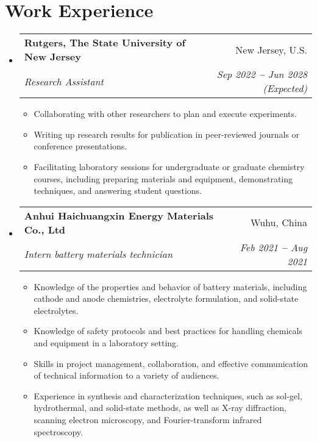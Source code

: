 \documentclass[letterpaper,11pt]{article}
\makeatletter
\newcommand{\resumeItem}[1]{
	\item\small{
		{#1 \vspace{-2pt}}
	}
}
\newcommand{\resumeSubheading}[4]{
	\vspace{-2pt}\item
	\begin{tabular*}{0.97\textwidth}[t]{l@{\extracolsep{\fill}}r}
		\textbf{#1} & #2 \\
		\textit{\small#3} & \textit{\small #4} \\
	\end{tabular*}\vspace{-7pt}
}
\newcommand{\resumeSubHeadingListStart}{\begin{itemize}[leftmargin=0.15in, label={}]}
\newcommand{\resumeSubHeadingListEnd}{\end{itemize}}
\newcommand{\resumeItemListStart}{\begin{itemize}}
\newcommand{\resumeItemListEnd}{\end{itemize}\vspace{-5pt}}
\makeatother
\begin{document}
	
	\section{\textbf{\color{red}Work Experience}}
	\vspace{3pt}
	\resumeSubHeadingListStart
	
	\resumeSubheading
	{Rutgers, The State University of New Jersey}{New Jersey, U.S.}
	{Research Assistant}{Sep 2022 \textbf{--} Jun 2028 (Expected)}
	\resumeItemListStart
	\resumeItem{Collaborating with other researchers to plan and execute experiments.}
	\resumeItem{Writing up research results for publication in peer-reviewed journals or conference presentations.}
	\resumeItem{Facilitating laboratory sessions for undergraduate or graduate chemistry courses, including preparing materials and equipment, demonstrating techniques, and answering student questions.}
	\resumeItemListEnd
	
	\resumeSubheading
	{Anhui Haichuangxin Energy Materials Co., Ltd}{Wuhu, China}
	{Intern battery materials technician}{Feb 2021 \textbf{--} Aug 2021}
	\resumeItemListStart
	\resumeItem{Knowledge of the properties and behavior of battery materials, including cathode and anode chemistries, electrolyte formulation, and solid-state electrolytes.}
	\resumeItem{Knowledge of safety protocols and best practices for handling chemicals and equipment in a laboratory setting.}
	\resumeItem{Skills in project management, collaboration, and effective communication of technical information to a variety of audiences.}
	\resumeItem{Experience in synthesis and characterization techniques, such as sol-gel, hydrothermal, and solid-state methods, as well as X-ray diffraction, scanning electron microscopy, and Fourier-transform infrared spectroscopy.}
	\resumeItemListEnd
	
	\resumeSubHeadingListEnd
	
	
	
	
\end{document}
